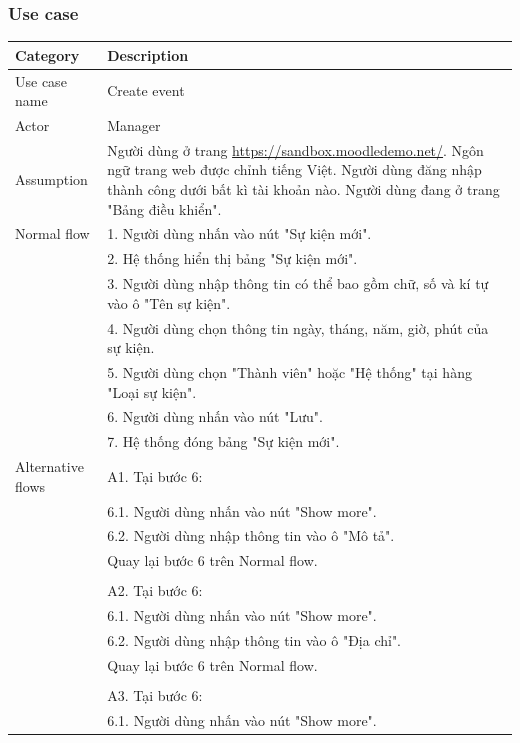 \documentclass[a4paper, 12pt]{article}
\begin{document}
\subsubsection{Use case}
\begin{table}[H]
    \centering
    \begin{tabular}{|l|p{11cm}|}
        \hline
        Category & Description \\
        \hline
        Use case name & Create event\\
        \hline
        Actor & Manager \\
        \hline
        Assumption & Người dùng ở trang \url{https://sandbox.moodledemo.net/}. Ngôn ngữ trang web được chỉnh tiếng Việt. Người dùng đăng nhập thành công dưới bất kì tài khoản nào. Người dùng đang ở trang "Bảng điều khiển". \\
        \hline
        Normal flow & 1. Người dùng nhấn vào nút "Sự kiện mới". \\
        & 2. Hệ thống hiển thị bảng "Sự kiện mới". \\
        & 3. Người dùng nhập thông tin có thể bao gồm chữ, số và kí tự vào ô "Tên sự kiện". \\
        & 4. Người dùng chọn thông tin ngày, tháng, năm, giờ, phút của sự kiện. \\
        & 5. Người dùng chọn "Thành viên" hoặc "Hệ thống" tại hàng "Loại sự kiện".\\
        & 6. Người dùng nhấn vào nút "Lưu". \\
        & 7. Hệ thống đóng bảng "Sự kiện mới". \\
        \hline
        Alternative flows & A1. Tại bước 6: \\
        & 6.1. Người dùng nhấn vào nút "Show more". \\
        & 6.2. Người dùng nhập thông tin vào ô "Mô tả". \\
        & Quay lại bước 6 trên Normal flow. \\
        & \\
        & A2. Tại bước 6: \\
        & 6.1. Người dùng nhấn vào nút "Show more". \\
        & 6.2. Người dùng nhập thông tin vào ô "Địa chỉ". \\
        & Quay lại bước 6 trên Normal flow. \\
        & \\
        & A3. Tại bước 6: \\
        & 6.1. Người dùng nhấn vào nút "Show more". \\

\end{tabular}
\end{table}
\end{document}
